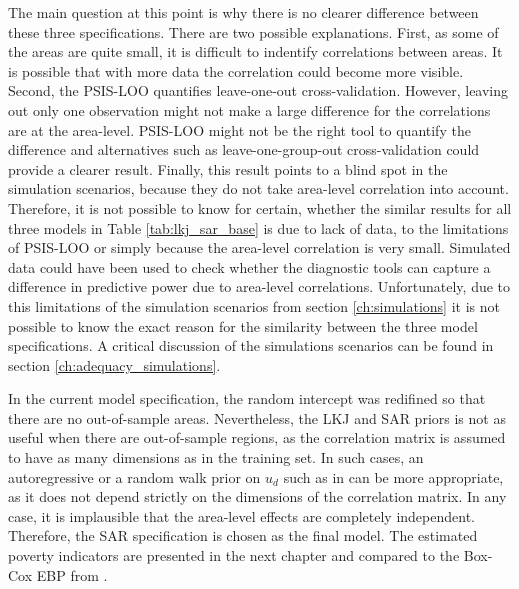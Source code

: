 The main question at this point is why there is no clearer difference between these three specifications.
There are two possible explanations.
First, as some of the areas are quite small, it is difficult to indentify correlations between areas.
It is possible that with more data the correlation could become more visible.
Second, the PSIS-LOO quantifies leave-one-out cross-validation.
However, leaving out only one observation might not make a large difference for the correlations are at the area-level.
PSIS-LOO might not be the right tool to quantify the difference and alternatives such as leave-one-group-out cross-validation could provide a clearer result.
Finally, this result points to a blind spot in the simulation scenarios, because they do not take area-level correlation into account.
Therefore, it is not possible to know for certain, whether the similar results for all three models in Table \ref{tab:lkj_sar_base} is due to lack of data, to the limitations of PSIS-LOO or simply because the area-level correlation is very small.
Simulated data could have been used to check whether the diagnostic tools can capture a difference in predictive power due to area-level correlations.
Unfortunately, due to this limitations of the simulation scenarios from section \ref{ch:simulations} it is not possible to know the exact reason for the similarity between the three model specifications.
A critical discussion of the simulations scenarios can be found in section \ref{ch:adequacy_simulations}.

In the current model specification, the random intercept was redifined so that there are no out-of-sample areas.
Nevertheless, the LKJ and SAR priors is not as useful when there are out-of-sample regions, as the correlation matrix is assumed to have as many dimensions as in the training set.
In such cases, an autoregressive or a random walk prior on $u_d$ such as in \cite{gao_improving_2021} can be more appropriate, as it does not depend strictly on the dimensions of the correlation matrix.
In any case, it is implausible that the area-level effects are completely independent.
Therefore, the SAR specification is chosen as the final model.
The estimated poverty indicators are presented in the next chapter and compared to the Box-Cox EBP from \cite{rojas_perilla_data_2020}.












